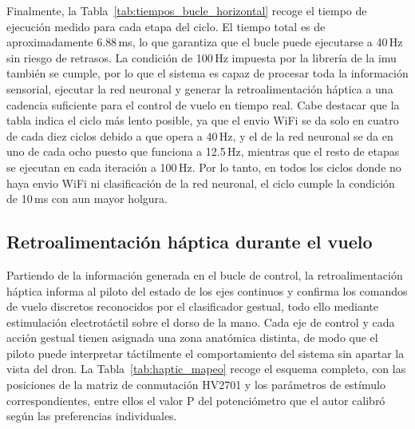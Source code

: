 \documentclass[12pt]{article}
\begin{document}
Finalmente, la Tabla~\ref{tab:tiempos_bucle_horizontal} recoge el tiempo de ejecución medido para cada etapa del ciclo. El tiempo total es de aproximadamente 6{.}88\,ms, lo que garantiza que el bucle puede ejecutarse a 40\,Hz sin riesgo de retrasos. La condición de 100\,Hz impuesta por la librería de la \gls{imu} también se cumple, por lo que el sistema es capaz de procesar toda la información sensorial, ejecutar la red neuronal y generar la retroalimentación háptica a una cadencia suficiente para el control de vuelo en tiempo real. Cabe destacar que la tabla indica el ciclo más lento posible, ya que el envio WiFi se da solo en cuatro de cada diez ciclos debido a que opera a 40\,Hz, y el de la red neuronal se da en uno de cada ocho puesto que funciona a 12{.}5\,Hz, mientras que el resto de etapas se ejecutan en cada iteración a 100\,Hz. Por lo tanto, en todos los ciclos donde no haya envio WiFi ni clasificación de la red neuronal, el ciclo cumple la condición de 10\,ms con aun mayor holgura.

\begin{table}[htbp]
\centering
\caption{Desglose de tiempos de ejecución de un ciclo completo de programa.}
\label{tab:tiempos_bucle_horizontal}
\end{table}


\subsection{Retroalimentación háptica durante el vuelo}
\label{sec:haptic_drone}

Partiendo de la información generada en el bucle de control, la retroalimentación háptica informa al piloto del estado de los ejes continuos y confirma los comandos de vuelo discretos reconocidos por el clasificador gestual, todo ello mediante estimulación electrotáctil sobre el dorso de la mano. Cada eje de control y cada acción gestual tienen asignada una zona anatómica distinta, de modo que el piloto puede interpretar táctilmente el comportamiento del sistema sin apartar la vista del dron. La Tabla~\ref{tab:haptic_mapeo} recoge el esquema completo, con las posiciones de la matriz de conmutación HV2701 y los parámetros de estímulo correspondientes, entre ellos el valor $\mathrm{P}$ del potenciómetro que el autor calibró según las preferencias individuales.
\end{document}
